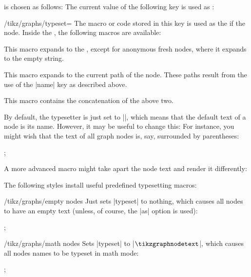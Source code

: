 \begin{itemize}
  is chosen as follows: The current value of the following key is used as
  :
  \begin{key}{/tikz/graphs/typeset=}
    The macro or code stored in this key is used as the
     if the node. Inside the , the following
    macros are available:
    \begin{command}{\tikzgraphnodetext}
      This macro expands to the , except for
      anonymous fresh nodes, where it expands to the empty string.
    \end{command}
    \begin{command}{\tikzgraphnodepath}
      This macro expands to the current path of the node. These
      paths result from the use of the |name| key as described above.
    \end{command}
    \begin{command}{\tikzgraphnodefullname}
      This macro contains the concatenation of the above two.
    \end{command}
  \end{key}
  By default, the typesetter is just set to |\tikzgraphnodetext|,
  which means that the default text of a node is its name. However,
  it may be useful to change this: For instance, you might wish that
  the text of all graph nodes is, say, surrounded by parentheses:
  \begin{codeexample}[]
\tikz {};
  \end{codeexample}
  A more advanced macro might take apart the node text and render it
  differently: 
  The following styles install useful predefined typesetting macros:
  \begin{key}{/tikz/graphs/empty nodes}
    Just sets |typeset| to nothing, which causes all nodes to have an
    empty text (unless, of course, the |as| option is used):
    \begin{codeexample}[]
\tikz {};  
    \end{codeexample}
  \end{key}
  \begin{key}{/tikz/graphs/math nodes}
    Sets |typeset| to |$\tikzgraphnodetext$|, which causes all nodes
    names to be typeset in math mode:
    \begin{codeexample}[]
\tikz {};  
    \end{codeexample}
  \end{key}
\end{itemize}

